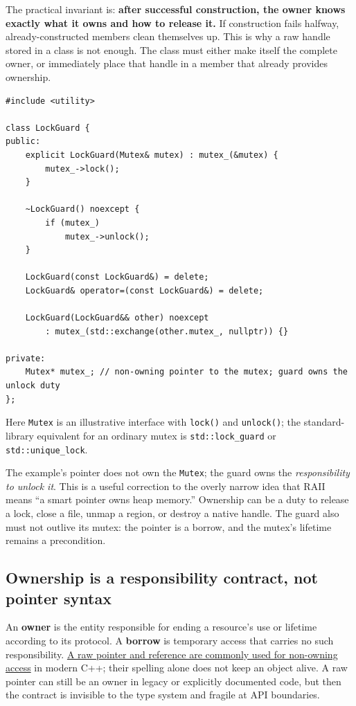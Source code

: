 The practical invariant is: \textbf{after successful construction, the owner knows exactly what it owns and how to release it.} If construction fails halfway, already-constructed members clean themselves up. This is why a raw handle stored in a class is not enough. The class must either make itself the complete owner, or immediately place that handle in a member that already provides ownership.

\begin{verbatim}
#include <utility>

class LockGuard {
public:
    explicit LockGuard(Mutex& mutex) : mutex_(&mutex) {
        mutex_->lock();
    }

    ~LockGuard() noexcept {
        if (mutex_)
            mutex_->unlock();
    }

    LockGuard(const LockGuard&) = delete;
    LockGuard& operator=(const LockGuard&) = delete;

    LockGuard(LockGuard&& other) noexcept
        : mutex_(std::exchange(other.mutex_, nullptr)) {}

private:
    Mutex* mutex_; // non-owning pointer to the mutex; guard owns the unlock duty
};
\end{verbatim}

Here \texttt{Mutex} is an illustrative interface with \texttt{lock()} and \texttt{unlock()}; the standard-library equivalent for an ordinary mutex is \texttt{std::lock\_guard} or \texttt{std::unique\_lock}.

The example's pointer does not own the \texttt{Mutex}; the guard owns the \emph{responsibility to unlock it}. This is a useful correction to the overly narrow idea that RAII means ``a smart pointer owns heap memory.'' Ownership can be a duty to release a lock, close a file, unmap a region, or destroy a native handle. The guard also must not outlive its mutex: the pointer is a borrow, and the mutex's lifetime remains a precondition.

\subsection{Ownership is a responsibility contract, not pointer syntax}\label{05-engine-i-ch004-ownership-is-a-responsibility-contract-not-pointer-syntax}

\hypertarget{05-engine-i-ch004-ownership-is-a-responsibility-contract-not-pointer-syntax}{}

An \textbf{owner} is the entity responsible for ending a resource's use or lifetime according to its protocol. A \textbf{borrow} is temporary access that carries no such responsibility. \hyperref[appendix-d52e4486f527]{A raw pointer and reference are commonly used for non-owning access} in modern C++; their spelling alone does not keep an object alive. A raw pointer can still be an owner in legacy or explicitly documented code, but then the contract is invisible to the type system and fragile at API boundaries.

